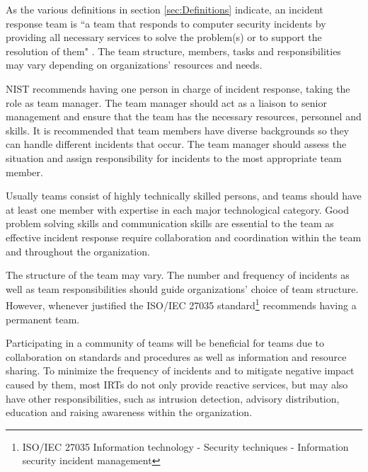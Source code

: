 As the various definitions in section \ref{sec:Definitions} indicate, an incident response team is ``a team that responds to computer security incidents by providing all necessary services to solve the problem(s) or to support the resolution of them" \cite{enisaCSIRTGoodPractices}. The team structure, members, tasks and responsibilities may vary depending on organizations' resources and needs. 

\ac{NIST} recommends having one person in charge of incident response, taking the role as team manager. The team manager should act as a liaison to senior management and ensure that the team has the necessary resources, personnel and skills. It is recommended that team members have diverse backgrounds so they can handle different incidents that occur. The team manager should assess the situation and assign responsibility for incidents to the most appropriate team member. \cite{nist800-61}

Usually teams consist of highly technically skilled persons, and teams should have at least one member with expertise in each major technological category. Good problem solving skills and communication skills are essential to the team as effective incident response require collaboration and coordination within the team and throughout the organization. \cite{nist800-61}

The structure of the team may vary. The number and frequency of incidents as well as team responsibilities should guide organizations' choice of team structure. However, whenever justified  the ISO/IEC 27035 standard\footnote{ISO/IEC 27035 Information technology - Security techniques - Information security incident management} recommends having a permanent team. \cite{ISO/IEC27035}

%

Participating in a community of teams will be beneficial for teams due to collaboration on standards and procedures as well as information and resource sharing. To minimize the frequency of incidents and to mitigate negative impact caused by them, most \acp{IRT} do not only provide reactive services, but may also have other responsibilities, such as intrusion detection, advisory distribution, education and raising awareness within the organization. \cite{nist800-61}  
  
